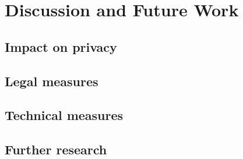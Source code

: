 \section{Discussion and Future Work}

\subsection{Impact on privacy}

\subsection{Legal measures}

\subsection{Technical measures}

\subsection{Further research}